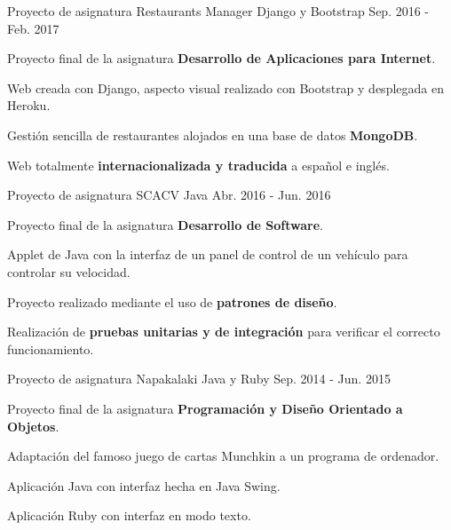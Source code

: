 \begin{cventries}
  \cventry
    {Proyecto de asignatura} %
    {Restaurants Manager} %
    {Django y Bootstrap} %
    {Sep. 2016 - Feb. 2017} %
    {
      \begin{cvitems} %
        \item {Proyecto final de la asignatura \textbf{Desarrollo de Aplicaciones para Internet}.}
        \item {Web creada con Django, aspecto visual realizado con Bootstrap y desplegada en Heroku.}
        \item {Gestión sencilla de restaurantes alojados en una base de datos \textbf{MongoDB}.}
        \item {Web totalmente \textbf{internacionalizada y traducida} a español e inglés.}
      \end{cvitems}
    }

  \cventry
    {Proyecto de asignatura} %
    {SCACV} %
    {Java} %
    {Abr. 2016 - Jun. 2016} %
    {
      \begin{cvitems} %
        \item {Proyecto final de la asignatura \textbf{Desarrollo de Software}.}
        \item {Applet de Java con la interfaz de un panel de control de un vehículo para controlar su velocidad.}
        \item {Proyecto realizado mediante el uso de \textbf{patrones de diseño}.}
        \item {Realización de \textbf{pruebas unitarias y de integración} para verificar el correcto funcionamiento.}
      \end{cvitems}
    }

  \cventry
    {Proyecto de asignatura} %
    {Napakalaki} %
    {Java y Ruby} %
    {Sep. 2014 - Jun. 2015} %
    {
      \begin{cvitems} %
        \item {Proyecto final de la asignatura \textbf{Programación y Diseño Orientado a Objetos}.}
        \item {Adaptación del famoso juego de cartas Munchkin a un programa de ordenador.}
        \item {Aplicación Java con interfaz hecha en Java Swing.}
        \item {Aplicación Ruby con interfaz en modo texto.}
      \end{cvitems}
    }

\end{cventries}
